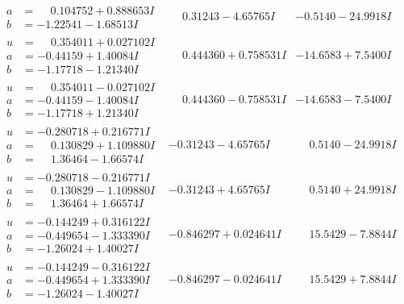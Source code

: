 \documentclass[1p]{elsarticle_modified}
\theoremstyle{definition}
\begin{document}
$$\begin{array}{c|c|c}
\begin{aligned}
a &= \phantom{-}0.104752 + 0.888653 I \\
b &= -1.22541 - 1.68513 I\end{aligned}
 & \phantom{-}0.31243 - 4.65765 I & -0.5140 - 24.9918 I \\ \hline\begin{aligned}
u &= \phantom{-}0.354011 + 0.027102 I \\
a &= -0.44159 + 1.40084 I \\
b &= -1.17718 - 1.21340 I\end{aligned}
 & \phantom{-}0.444360 + 0.758531 I & -14.6583 + 7.5400 I \\ \hline\begin{aligned}
u &= \phantom{-}0.354011 - 0.027102 I \\
a &= -0.44159 - 1.40084 I \\
b &= -1.17718 + 1.21340 I\end{aligned}
 & \phantom{-}0.444360 - 0.758531 I & -14.6583 - 7.5400 I \\ \hline\begin{aligned}
u &= -0.280718 + 0.216771 I \\
a &= \phantom{-}0.130829 + 1.109880 I \\
b &= \phantom{-}1.36464 - 1.66574 I\end{aligned}
 & -0.31243 - 4.65765 I & \phantom{-}0.5140 - 24.9918 I \\ \hline\begin{aligned}
u &= -0.280718 - 0.216771 I \\
a &= \phantom{-}0.130829 - 1.109880 I \\
b &= \phantom{-}1.36464 + 1.66574 I\end{aligned}
 & -0.31243 + 4.65765 I & \phantom{-}0.5140 + 24.9918 I \\ \hline\begin{aligned}
u &= -0.144249 + 0.316122 I \\
a &= -0.449654 - 1.333390 I \\
b &= -1.26024 + 1.40027 I\end{aligned}
 & -0.846297 + 0.024641 I & \phantom{-}15.5429 - 7.8844 I \\ \hline\begin{aligned}
u &= -0.144249 - 0.316122 I \\
a &= -0.449654 + 1.333390 I \\
b &= -1.26024 - 1.40027 I\end{aligned}
 & -0.846297 - 0.024641 I & \phantom{-}15.5429 + 7.8844 I\\

\end{array}$$
\end{document}
